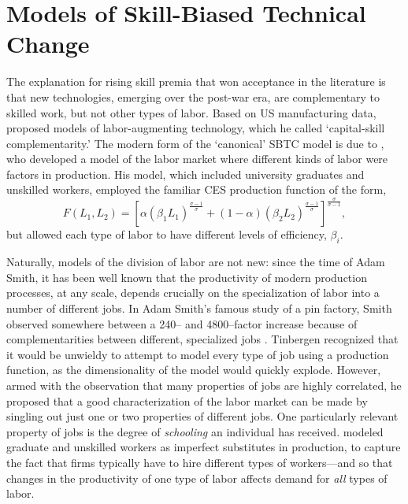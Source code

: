 \section{Models of Skill-Biased Technical Change}

The explanation for rising skill premia that won acceptance in the literature is that new technologies, emerging over the post-war era, are complementary to skilled work, but not other types of labor. Based on US manufacturing data, \citet{Griliches1969} proposed models of labor-augmenting technology, which he called `capital-skill complementarity.' The modern form of the `canonical' SBTC model is due to \citet{Tinbergen1974,Tinbergen1975}, who developed a model of the labor market where different kinds of labor were factors in production. His model, which included university graduates and unskilled workers, employed the familiar CES production function of the form,
\begin{equation} F(L_1, L_2) = \left[\alpha (\beta_1L_1)^{\frac{\sigma-1}{\sigma}} + (1-\alpha) (\beta_2L_2)^{\frac{\sigma-1}{\sigma}}\right]^{\frac{\sigma}{\sigma-1}}, \end{equation}
but allowed each type of labor to have different levels of efficiency, $\beta_i$.

Naturally, models of the division of labor are not new: since the time of Adam Smith, it has been well known that the productivity of modern production processes, at any scale, depends crucially on the specialization of labor into a number of different jobs. In Adam Smith's famous study of a pin factory, Smith observed somewhere between a 240-- and 4800--factor increase because of complementarities between different, specialized jobs \citep[I.3]{Smith1776}. Tinbergen recognized that it would be unwieldy to attempt to model every type of job using a production function, as the dimensionality of the model would quickly explode. However, armed with the observation that many properties of jobs are highly correlated, he proposed that a good characterization of the labor market can be made by singling out just one or two properties of different jobs. One particularly relevant property of jobs is the degree of {\em schooling} an individual has received. \citet{Tinbergen1974} modeled graduate and unskilled workers as imperfect substitutes in production, to capture the fact that firms typically have to hire different types of workers---and so that changes in the productivity of one type of labor affects demand for {\em all} types of labor.

